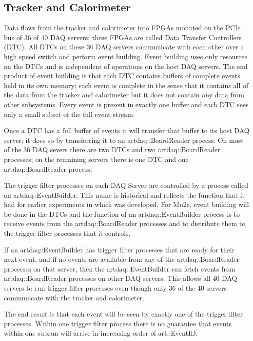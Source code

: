 \subsection{Tracker and Calorimeter}
\label{ssec:TrkAndCal}

Data flows from the tracker and calorimeter into FPGAs mounted on the PCIe bus of 36 of 40 DAQ servers;
these FPGAs are called Data Transfer Controllers (DTC).
All DTCs on these 36 DAQ servers communicate with each other over a high speed switch
and perform event building.
Event building uses only resources on the DTCs and is independent of operations on the host DAQ servers.
The end product of event building is that each DTC contains buffers of complete events held in its own memory;
each event is complete in the sense that it contains all of the data from the tracker and calorimeter
but it does not contain any data from other subsystems.
Every event is present in exactly one buffer and each DTC sees only a small subset of the full event stream.

Once a DTC has a full buffer of events it will transfer that buffer to its host DAQ server;
it does so by transferring it to an {\code artdaq::BoardReader} process.  On most of the
36 DAQ severs there are two DTCs and two {\code artdaq::BoardReader} processes;
on the remaining servers there is one DTC and one {\code artdaq::BoardReader} process.

The trigger filter processes on each DAQ Server are controlled by a process
called an {\code artdaq::EventBuilder}.
This name is historical and reflects the function that it had for earlier experiments in which \artdaq was developed.
For Mu2e, event building will be done in the DTCs and the function of an
{\code artdaq::EventBuilder} process is to receive events from
the {\code artdaq::BoardReader} processes and to distribute them to the trigger filter \art processes
that it controls.

If an {\code artdaq::EventBuilder} has trigger filter processes that are ready for their next event,
and if no events are available from any of the {\code artdaq::BoardReader} processes on that server,
then the {\code artdaq::EventBuilder} can fetch events from {\code artdaq::BoardReader} processes
on other DAQ servers.
This allows all 40 DAQ servers to run trigger filter processes even though only 36 of the 40 servers
communicate with the tracker and calorimeter.

The end result is that each event will be seen by exactly one of the trigger filter processes.
Within one trigger filter process there is no guarantee that events within one subrun will arrive in
increasing order of {\code art::EventID}.

